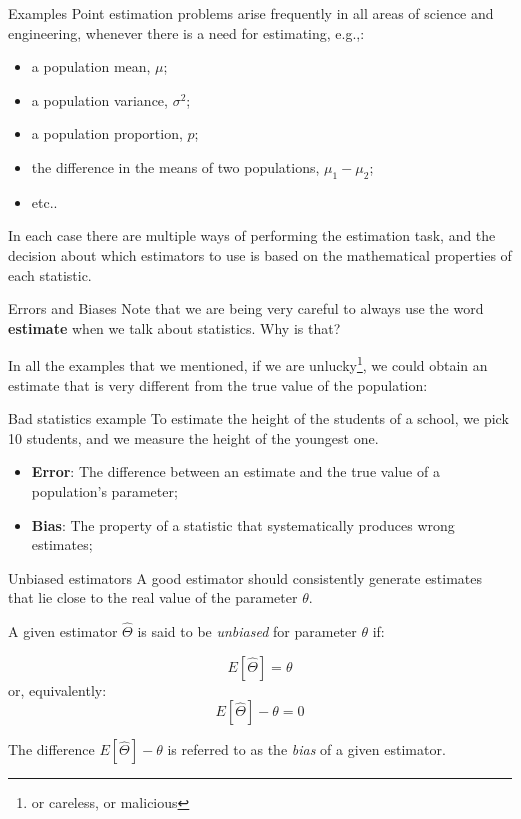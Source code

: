\begin{frame}{Examples}
Point estimation problems arise frequently in all areas of science and engineering, whenever there is a need for estimating, e.g.,:\bigskip

\begin{itemize}
  \item a population  mean, $\mu$;
	\item a population variance, $\sigma^2$;
	\item a population proportion, $p$;
	\item the difference in the means of two populations, $\mu_1-\mu_2$;
	\item etc..
\end{itemize}\bigskip

In each case there are multiple ways of performing the estimation task, and the decision about which estimators to use is based on the mathematical properties of each statistic.
\end{frame}

\begin{frame}{Errors and Biases}
  Note that we are being very careful to always use the word {\bf estimate} when we talk about statistics. Why is that?
  \bigskip

  In all the examples that we mentioned, if we are unlucky\footnote{or careless, or malicious}, we could obtain an estimate that is very different from the true value of the population:
  \begin{alertblock}{Bad statistics example}
    To estimate the height of the students of a school, we pick 10 students, and we measure the height of the youngest one.
  \end{alertblock}\medskip
  \begin{itemize}
    \item {\bf Error}: The difference between an estimate and the true value of a population's parameter;
    \item {\bf Bias}: The property of a statistic that systematically produces wrong estimates;
  \end{itemize}
\end{frame}

\begin{frame}{Unbiased estimators}
A good estimator should consistently generate estimates that lie close to the real value of the parameter $\theta$.\bigskip

A given estimator $\hat{\Theta}$ is said to be \textit{unbiased} for parameter $\theta$ if:\bigskip

\begin{equation*}
E\left[\hat{\Theta}\right] = \theta
\end{equation*}
\noindent or, equivalently:
\begin{equation*}
E\left[\hat{\Theta}\right] - \theta = 0
\end{equation*}\bigskip

The difference $E\left[\hat{\Theta}\right] - \theta$ is referred to as the \textit{bias} of a given estimator.
\end{frame}

